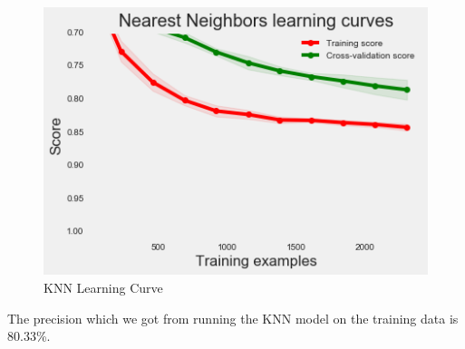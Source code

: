 \begin{figure}
\caption{KNN Learning Curve}
\label{5.2}
\centering
\includegraphics[width=\columnwidth]{images/5_2.png}
\end{figure}

The precision which we got from running the KNN model on the training data is 80.33\%.

